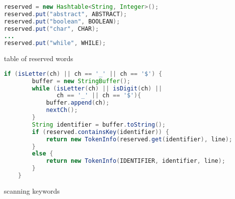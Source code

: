 \documentclass[8pt,a4paper,compress]{beamer}
\begin{document}
\begin{frame}[fragile]
\pause

\begin{tcolorbox}[enhanced,drop shadow southwest,sharp corners,size=fbox,colback=white,fontlower=\small\ttfamily,collower=silver900]

\begin{lstlisting}[language=Java,style=focusin]
reserved = new Hashtable<String, Integer>();
reserved.put("abstract", ABSTRACT);  
reserved.put("boolean", BOOLEAN);         
reserved.put("char", CHAR);
...
reserved.put("while", WHILE);
\end{lstlisting}

\tcblower
\begin{minipage}[t][.25cm][t]{\textwidth}
table of reserved words
\end{minipage}
\end{tcolorbox}

\bigskip

\begin{overprint}
\begin{tcolorbox}[enhanced,drop shadow southwest,sharp corners,size=fbox,colback=white,fontlower=\small\ttfamily,collower=silver900]

\begin{lstlisting}[language=Java,style=focusin]
    if (isLetter(ch) || ch == '_' || ch == '$') {
        buffer = new StringBuffer();
        while (isLetter(ch) || isDigit(ch) || 
               ch == '_' || ch == '$'){
            buffer.append(ch);
            nextCh();
        }
        String identifier = buffer.toString();                 
        if (reserved.containsKey(identifier)) {
            return new TokenInfo(reserved.get(identifier), line); 
        }
        else {                     
            return new TokenInfo(IDENTIFIER, identifier, line);                 
        }
    }
\end{lstlisting}

\tcblower
\begin{minipage}[t][.25cm][t]{\textwidth}
scanning keywords
\end{minipage}
\end{tcolorbox}

\begin{tcolorbox}[enhanced,drop shadow southwest,sharp corners,size=fbox,colback=white,fontlower=\small\ttfamily,collower=silver900]


\end{tcolorbox}
\end{overprint}
\end{frame}
\end{document}

